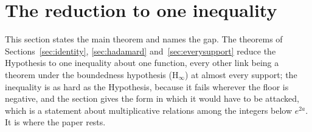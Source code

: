 \documentclass[11pt]{article}
\theoremstyle{definition}
\theoremstyle{remark}
\begin{document}
\section{The reduction to one inequality}\label{sec:unconditional}

This section states the main theorem and names the gap. The theorems of Sections~\ref{sec:identity}, \ref{sec:hadamard} and~\ref{sec:everysupport} reduce the Hypothesis to one inequality about one function, every other link being a theorem under the boundedness hypothesis (H$_\infty$) at almost every support; the inequality is as hard as the Hypothesis, because it fails wherever the floor is negative, and the section gives the form in which it would have to be attacked, which is a statement about multiplicative relations among the integers below $e^{2a}$. It is where the paper rests.
\end{document}
